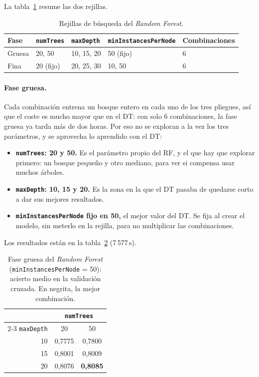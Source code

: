 \documentclass[12pt,a4paper]{article}
\begin{document}
La tabla~\ref{tab:rejilla-rf} resume las dos rejillas.

\begin{table}[H]
\centering
\small
\begin{tabular}{lllll}
\toprule
\textbf{Fase} & \texttt{numTrees} & \texttt{maxDepth} & \texttt{minInstancesPerNode} & \textbf{Combinaciones} \\
\midrule
Gruesa & 20, 50    & 10, 15, 20 & 50 (fijo) & 6 \\
Fina   & 20 (fijo) & 20, 25, 30 & 10, 50    & 6 \\
\bottomrule
\end{tabular}
\caption{Rejillas de búsqueda del \textit{Random Forest}.}
\label{tab:rejilla-rf}
\end{table}

\paragraph{Fase gruesa.} Cada combinación entrena un bosque entero en cada
uno de los tres pliegues, así que el coste es mucho mayor que en el
\ac{DT}: con solo 6 combinaciones, la fase gruesa ya tarda más de dos
horas. Por eso no se exploran a la vez los tres parámetros, y se aprovecha
lo aprendido con el \ac{DT}:
\begin{itemize}
    \item \textbf{\texttt{numTrees}: 20 y 50.} Es el parámetro propio del
    \ac{RF}, y el que hay que explorar primero: un bosque pequeño y otro
    mediano, para ver si compensa usar muchos árboles.
    \item \textbf{\texttt{maxDepth}: 10, 15 y 20.} Es la zona en la que el
    \ac{DT} pasaba de quedarse corto a dar sus mejores resultados.
    \item \textbf{\texttt{minInstancesPerNode} fijo en 50,} el mejor valor
    del \ac{DT}. Se fija al crear el modelo, sin meterlo en la rejilla, para
    no multiplicar las combinaciones.
\end{itemize}
Los resultados están en la tabla~\ref{tab:rf-fase1} (7\,577\,s).

\begin{table}[H]
\centering
\small
\begin{tabular}{rcc}
\toprule
 & \multicolumn{2}{c}{\texttt{numTrees}} \\
\cmidrule(lr){2-3}
\texttt{maxDepth} & 20 & 50 \\
\midrule
10 & 0,7775 & 0,7800 \\
15 & 0,8001 & 0,8009 \\
20 & 0,8076 & \textbf{0,8085} \\
\bottomrule
\end{tabular}
\caption{Fase gruesa del \textit{Random Forest} (\texttt{minInstancesPerNode}
= 50): acierto medio en la validación cruzada. En negrita, la mejor
combinación.}
\label{tab:rf-fase1}
\end{table}
\end{document}
